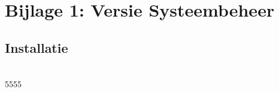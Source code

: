 \label{Bijlage 1}

\appendix
\section{Bijlage 1: Versie Systeembeheer}

\subsection*{Installatie}\ \\[24pt]

5555